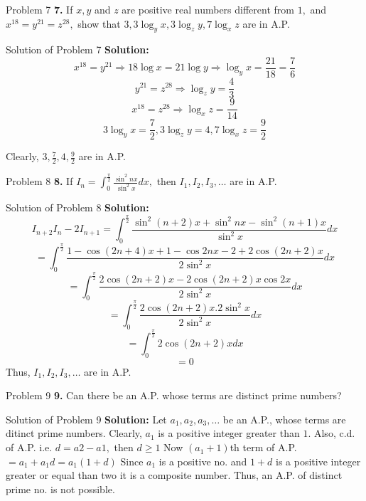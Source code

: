 \documentclass[aspectratio=1610,8pt]{beamer}
\begin{document}
\begin{frame}{Problem 7}
  \textbf{7.} If $x, y$ and $z$ are positive real numbers different from $1,$ and $x^{18} = y^{21} = z^{28},$ show that $3, 3\log_y
  x, 3\log_z y, 7\log_x z$ are in A.P.
\end{frame}
\begin{frame}{Solution of Problem 7}
  \textbf{Solution:} $$x^{18} = y^{21}\Rightarrow 18\log x = 21\log y \Rightarrow \log_y x = \frac{21}{18} = \frac{7}{6}$$
  $$y^{21} = z^{28} \Rightarrow \log_z y = \frac{4}{3}$$
  $$x^{18} = z^{28} \Rightarrow \log_x z = \frac{9}{14}$$
  $$3\log_y x = \frac{7}{2}, 3\log_z y = 4, 7\log_x z = \frac{9}{2}$$

  Clearly, $3, \frac{7}{2}, 4, \frac{9}{2}$ are in A.P.
\end{frame}
\begin{frame}{Problem 8}
  \textbf{8.} If $I_n = \int_{0}^{\frac{\pi}{2}}\frac{\sin^2nx}{\sin^2x}dx,$ then $I_1, I_2, I_3, \ldots$ are in A.P.
\end{frame}
\begin{frame}{Solution of Problem 8}
  \textbf{Solution:} $$I_{n + 2}I_n - 2I_{n + 1} = \int_{0}^{\frac{\pi}{2}}\frac{\sin^2(n + 2)x + \sin^2nx - \sin^2(n +
    1)x}{\sin^2x}dx$$
  $$= \int_{0}^{\frac{\pi}{2}}\frac{1 - \cos(2n + 4)x + 1 - \cos 2nx - 2 + 2\cos(2n + 2)x}{2\sin^2x}dx$$
  $$= \int_{0}^{\frac{\pi}{2}}\frac{2\cos(2n + 2)x - 2\cos(2n + 2)x\cos 2x}{2\sin^2x}dx$$
  $$= \int_{0}^{\frac{\pi}{2}}\frac{2\cos(2n + 2)x.2\sin^2x}{2\sin^2x}dx$$
  $$= \int_{0}^{\frac{\pi}{2}}2\cos(2n + 2)x dx$$
  $$= 0$$
  Thus, $I_1, I_2, I_3, \ldots$ are in A.P.
\end{frame}
\begin{frame}{Problem 9}
  \textbf{9.} Can there be an A.P. whose terms are distinct prime numbers?
\end{frame}
\begin{frame}{Solution of Problem 9}
  \textbf{Solution:} Let $a_1, a_2, a_3, \ldots$ be an A.P., whose terms are ditinct prime numbers.
  \linebreak\linebreak
  Clearly, $a_1$ is a positive integer greater than $1.$
  \linebreak\linebreak
  Also, c.d. of A.P. i.e. $d = a2 - a1,$ then $d\geq 1$
  \linebreak\linebreak
  Now $(a_1 + 1)$th term of A.P. $= a_1 + a_1d = a_1(1 + d)$
  \linebreak\linebreak
  Since $a_1$ is a positive no. and $1 + d$ is a positive integer greater or equal than two it is a composite number. Thus, an
  A.P. of distinct prime no. is not possible.
\end{frame}
\end{document}
